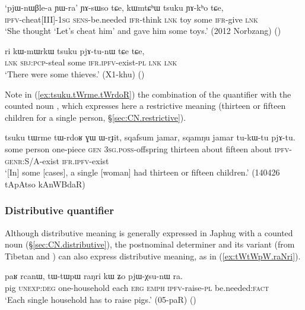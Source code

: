 \begin{exe}
\ex \label{ex:kWmtChW.tsuku}
\gll  `pjɯ-nɯβle-a ɲɯ-ra' ɲɤ-sɯso tɕe, kɯmtɕʰɯ tsuku ɲɤ-kʰo tɕe, \\
\textsc{ipfv}-cheat[III]-\textsc{1sg} \textsc{sens}-be.needed \textsc{ifr}-think \textsc{lnk} toy some \textsc{ifr}-give \textsc{lnk} \\
\glt `She thought `Let's cheat him' and gave him some toys.' (2012 Norbzang)
()
\end{exe}

\begin{exe}
\ex \label{ex:kWmWrkW.tsuku}
\gll ri kɯ-mɯrkɯ tsuku pjɤ-tu-nɯ tɕe tɕe, \\
\textsc{lnk} \textsc{sbj}:\textsc{pcp}-steal some \textsc{ifr}.\textsc{ipfv}-exist-\textsc{pl} \textsc{lnk} \textsc{lnk} \\
\glt `There were some thieves.' (X1-khu)
()
\end{exe}

Note in (\ref{ex:tsuku.tWrme.tWrdoR}) the combination of the quantifier  with the counted noun , which expresses here a restrictive meaning (thirteen or fifteen children for a single person, §\ref{sec:CN.restrictive}).

\begin{exe}
\ex \label{ex:tsuku.tWrme.tWrdoR}
\gll tsuku tɯrme tɯ-rdoʁ ɣɯ ɯ-rɟit, sqafsum jamar, sqamŋu jamar tu-kɯ-tu pjɤ-tu. \\
 some person one-piece \textsc{gen} \textsc{3sg}.\textsc{poss}-offspring thirteen about fifteen about \textsc{ipfv}-\textsc{genr}:S/A-exist \textsc{ifr}.\textsc{ipfv}-exist    \\
\glt  `[In] some [cases], a single [woman] had thirteen or fifteen children.' (140426 tApAtso kAnWBdaR)
\end{exe}
 
\subsubsection{Distributive quantifier} \label{sec:raNri}
 Although distributive meaning is generally expressed in Japhug with a counted noun (§\ref{sec:CN.distributive}), the postnominal determiner  and its variant  (from Tibetan  and ) can also express distributive meaning, as in (\ref{ex:tWtWpW.raNri}). 
 
\begin{exe}
\ex \label{ex:tWtWpW.raNri}
\gll paʁ rcanɯ, tɯ-tɯpɯ raŋri kɯ ʑo pjɯ-χsu-nɯ ra.\\
pig \textsc{unexp}:\textsc{deg} one-household each \textsc{erg} \textsc{emph} \textsc{ipfv}-raise-\textsc{pl} be.needed:\textsc{fact}\\
\glt `Each single household has to raise pigs.' (05-paR) ()
 \end{exe}
 
